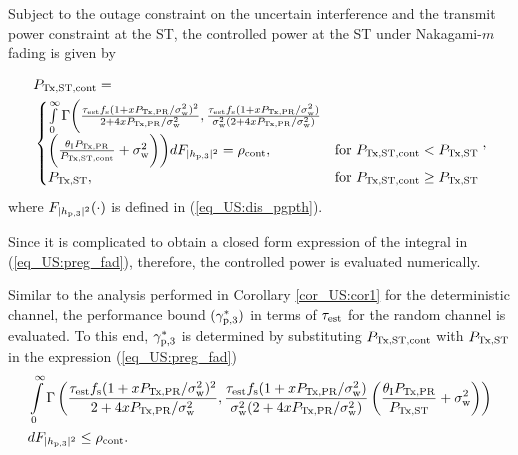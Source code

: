 \begin{lemma} \label{lm_US:lm6}
\normalfont
Subject to the outage constraint on the uncertain interference and the transmit power constraint at the ST, the controlled power at the ST under Nakagami-$m$ fading is given by %

\begin{align}
&P_{\text{Tx,ST,cont}} = \nonumber \\ 
&\begin{cases} 
\int\limits_{0}^{\infty} \Gamma\bigg(\frac{\tau_{\text{est}} f_{\text{s}} (1 + x P_{\text{Tx,PR}}/\sigma^2_{\text{w}})^2}{2 + 4 x P_{\text{Tx,PR}}/\sigma^2_{\text{w}}}, \frac{\tau_{\text{est}} f_{\text{s}} (1 + x P_{\text{Tx,PR}}/\sigma^2_{\text{w}})}{\sigma^2_{\text{w}} (2 + 4 x P_{\text{Tx,PR}}/\sigma^2_{\text{w}})} \\ \bigg(\frac{\theta_{\text{I}}P_{\text{Tx,PR}}}{P_{\text{Tx,ST,cont}}}  +  \sigma^2_{\text{w}} \bigg)\bigg) d F_{|h_{\text{p,3}}|^2} = \rho_{\text{cont}}, & \mbox{for } P_{\text{Tx,ST,cont}} < P_{\text{Tx,ST}} \\
P_{\text{Tx,ST}}, & \mbox{for } P_{\text{Tx,ST,cont}} \ge P_{\text{Tx,ST}}
\end{cases},
\label{eq_US:preg_fad} 
\end{align}
where %
$F_{|h_{\text{p,3}}|^2}(\cdot)$ is defined in (\ref{eq_US:dis_pgpth}). 
\end{lemma} 
\begin{IEEEproof}[Solution]
Since it is complicated to obtain a closed form expression of the integral in (\ref{eq_US:preg_fad}), therefore, the controlled power is evaluated numerically.  
\end{IEEEproof}
Similar to the analysis performed in Corollary \ref{cor_US:cor1} for the deterministic channel, the performance bound $({\gamma}_{\text{p,3}}^*)$ in terms of $\tau_{\text{est}}$ for the random channel is evaluated. To this end, ${\gamma}_{\text{p,3}}^*$ is determined by substituting $P_{\text{Tx,ST,cont}}$ with $P_{\text{Tx,ST}}$ in the expression (\ref{eq_US:preg_fad}) 
\begin{align}
&\int\limits_{0}^{\infty} \Gamma\left( \frac{\tau_{\text{est}} f_{\text{s}} (1 + x P_{\text{Tx,PR}}/\sigma^2_{\text{w}})^2}{2 + 4 x P_{\text{Tx,PR}}/\sigma^2_{\text{w}}}, \frac{\tau_{\text{est}} f_{\text{s}} (1 + x P_{\text{Tx,PR}}/\sigma^2_{\text{w}})}{\sigma^2_{\text{w}} (2 + 4 x P_{\text{Tx,PR}}/\sigma^2_{\text{w}})}  \left(\frac{\theta_{\text{I}}P_{\text{Tx,PR}}}{P_{\text{Tx,ST}}} + \sigma^2_{\text{w}} \right)\right) \nonumber \\ & d F_{|h_{\text{p,3}}|^2} \le \rho_{\text{cont}}. \label{eq_US:or_fad}
\end{align}
